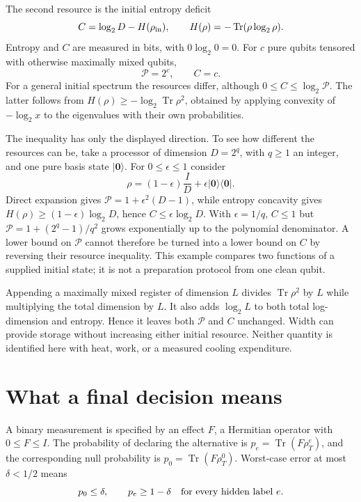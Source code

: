 \documentclass[11pt,a4paper]{article}
\numberwithin{equation}{section}
\theoremstyle{definition}
\theoremstyle{remark}
\DeclareMathOperator{\Tr}{Tr}
\begin{document}
The second resource is the initial entropy deficit
\begin{equation}
 C=\log_2D-H(\rho_{\rm in}),\qquad
 H(\rho)=-\Tr(\rho\log_2\rho).
 \label{q:entropy-resource}
\end{equation}
Entropy and $C$ are measured in bits, with $0\log_2 0=0$.
For $c$ pure qubits tensored with otherwise maximally mixed qubits,
\begin{equation}
 \mathcal P=2^c,\qquad C=c.
 \label{q:clean-count}
\end{equation}
For a general initial spectrum the resources differ, although
$0\leq C\leq\log_2\mathcal P$. The latter follows from
$H(\rho)\geq-\log_2\Tr\rho^2$, obtained by applying convexity of $-\log_2 x$
to the eigenvalues with their own probabilities.

The inequality has only the displayed direction. To see how different the
resources can be, take a processor of dimension $D=2^q$, with
$q\geq1$ an integer, and one pure basis state $|\mathbf0\rangle$. For
$0\leq\epsilon\leq1$ consider
\[
 \rho=(1-\epsilon)\frac{I}{D}
                  +\epsilon|\mathbf0\rangle\langle\mathbf0|.
\]
Direct expansion gives
$\mathcal P=1+\epsilon^2(D-1)$, while entropy concavity gives
$H(\rho)\geq(1-\epsilon)\log_2D$, hence
$C\leq\epsilon\log_2D$. With $\epsilon=1/q$,
$C\leq1$ but $\mathcal P=1+(2^q-1)/q^2$ grows exponentially up to the
polynomial denominator. A lower bound on $\mathcal P$ cannot therefore be
turned into a lower bound on $C$ by reversing their resource inequality.
This example compares two functions of a supplied initial state; it is not a
preparation protocol from one clean qubit.

Appending a maximally mixed register of dimension $L$ divides $\Tr\rho^2$ by
$L$ while multiplying the total dimension by $L$. It also adds $\log_2L$
to both total log-dimension and entropy. Hence it leaves both $\mathcal P$
and $C$ unchanged. Width can provide storage without increasing either initial
resource. Neither quantity is identified here with heat, work, or a measured
cooling expenditure.

\section{What a final decision means}

A binary measurement is specified by an effect $F$, a Hermitian operator with
$0\leq F\leq I$. The probability of declaring the alternative is
$p_e=\Tr(F\rho_T^e)$, and the corresponding null probability is
$p_0=\Tr(F\rho_T^0)$. Worst-case error at most $\delta<1/2$ means
\begin{equation}
 p_0\leq\delta,\qquad p_e\geq1-\delta
 \quad\hbox{for every hidden label }e.
 \label{q:worst-error}
\end{equation}
\end{document}
